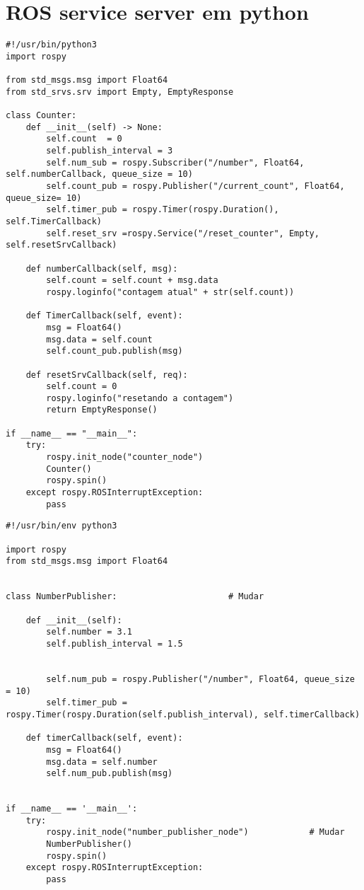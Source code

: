 \documentclass[letterpaper]{article}
\begin{document}
\section{ROS  service server em python}
\begin{lstlisting}[style=pythonStyle, title=counter.py] 
#!/usr/bin/python3
import rospy

from std_msgs.msg import Float64
from std_srvs.srv import Empty, EmptyResponse

class Counter:
    def __init__(self) -> None:
        self.count  = 0
        self.publish_interval = 3
        self.num_sub = rospy.Subscriber("/number", Float64, self.numberCallback, queue_size = 10)
        self.count_pub = rospy.Publisher("/current_count", Float64, queue_size= 10)
        self.timer_pub = rospy.Timer(rospy.Duration(), self.TimerCallback)
        self.reset_srv =rospy.Service("/reset_counter", Empty, self.resetSrvCallback)

    def numberCallback(self, msg):
        self.count = self.count + msg.data
        rospy.loginfo("contagem atual" + str(self.count))

    def TimerCallback(self, event):
        msg = Float64()
        msg.data = self.count
        self.count_pub.publish(msg)

    def resetSrvCallback(self, req):
        self.count = 0
        rospy.loginfo("resetando a contagem")
        return EmptyResponse()
        
if __name__ == "__main__":
    try:
        rospy.init_node("counter_node")
        Counter()
        rospy.spin()
    except rospy.ROSInterruptException:
        pass    
\end{lstlisting}
\begin{lstlisting}[style=pythonStyle, title=number\_publish.py] 
#!/usr/bin/env python3

import rospy
from std_msgs.msg import Float64


class NumberPublisher:         	            # Mudar

    def __init__(self):
        self.number = 3.1
        self.publish_interval = 1.5
    

        self.num_pub = rospy.Publisher("/number", Float64, queue_size = 10)
        self.timer_pub = rospy.Timer(rospy.Duration(self.publish_interval), self.timerCallback)
        
    def timerCallback(self, event):
        msg = Float64()
        msg.data = self.number
        self.num_pub.publish(msg)


if __name__ == '__main__':
    try:
        rospy.init_node("number_publisher_node")	        # Mudar
        NumberPublisher()
        rospy.spin()
    except rospy.ROSInterruptException:
        pass

\end{lstlisting}
\end{document}
